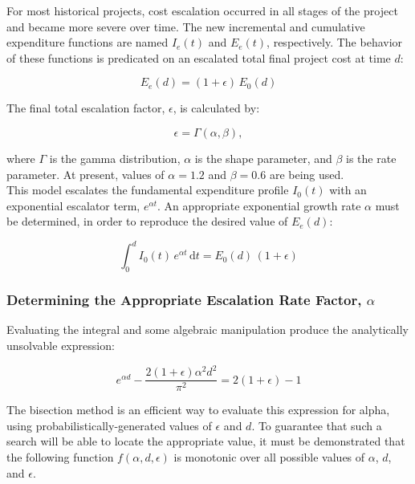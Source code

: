 \documentclass{article}
\begin{document}
For most historical projects, cost escalation occurred in all stages of the project and became more severe over time.
The new incremental and cumulative expenditure functions are named $I_e(t)$ and $E_e(t)$, respectively.
The behavior of these functions is predicated on an escalated total final project cost at time $d$:

\begin{equation}
  E_e(d) = (1 + \epsilon) \, E_0(d)
\end{equation}

The final total escalation factor, $\epsilon$, is calculated by:

\begin{equation*}
  \epsilon = \Gamma \left( \alpha, \beta \right),
\end{equation*}

where $\Gamma$ is the gamma distribution, $\alpha$ is the shape parameter, and $\beta$ is the rate parameter. At present, values of $\alpha = 1.2$ and $\beta = 0.6$ are being used.\\

This model escalates the fundamental expenditure profile $I_0(t)$ with an exponential escalator term, $e^{\alpha t}$.
An appropriate exponential growth rate $\alpha$ must be determined, in order to reproduce the desired value of $E_e(d)$:

\begin{equation}
  \int_0^d \! {I_0(t) \, e^{\alpha t} \, \mathrm{d}t} = E_0(d) \, \left( 1 + \epsilon \right)
\end{equation}

\subsubsection{Determining the Appropriate Escalation Rate Factor, $\alpha$}

Evaluating the integral and some algebraic manipulation produce the analytically unsolvable expression:

\begin{equation} \label{non-an}
  e^{\alpha d} - \frac{2 (1 + \epsilon) {\alpha}^2 d^2}{\pi^2} = 2 (1 + \epsilon) - 1
\end{equation}

The bisection method is an efficient way to evaluate this expression for alpha, using probabilistically-generated values of $\epsilon$ and $d$.
To guarantee that such a search will be able to locate the appropriate value, it must be demonstrated that the following function $f(\alpha, d, \epsilon)$ is monotonic over all possible values of $\alpha$, $d$, and $\epsilon$.
\end{document}
